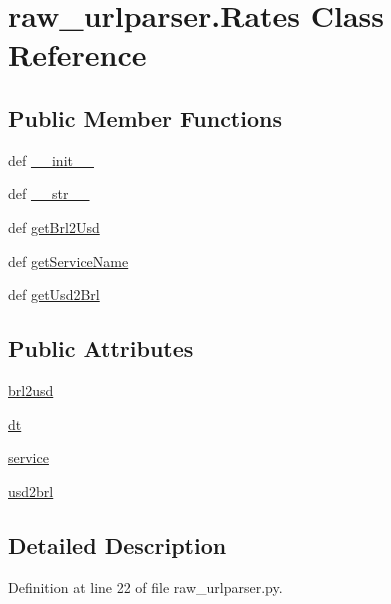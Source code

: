 \hypertarget{classraw__urlparser_1_1_rates}{\section{raw\-\_\-urlparser.\-Rates Class Reference}
\label{classraw__urlparser_1_1_rates}
}
\subsection*{Public Member Functions}
\begin{DoxyCompactItemize}
\item 
def \hyperlink{classraw__urlparser_1_1_rates_a2de6334a686a8a81c619d99de46e43df}{\-\_\-\-\_\-init\-\_\-\-\_\-}
\item 
def \hyperlink{classraw__urlparser_1_1_rates_a166ead3ebf1546ec2ea3eb299d524a30}{\-\_\-\-\_\-str\-\_\-\-\_\-}
\item 
def \hyperlink{classraw__urlparser_1_1_rates_a435ff5562321da275bb95823a346bc5c}{get\-Brl2\-Usd}
\item 
def \hyperlink{classraw__urlparser_1_1_rates_a4579624e853a4d83c5b7df9c390de5b5}{get\-Service\-Name}
\item 
def \hyperlink{classraw__urlparser_1_1_rates_aaf3f32369f17da5fc903a7a51feca25f}{get\-Usd2\-Brl}
\end{DoxyCompactItemize}
\subsection*{Public Attributes}
\begin{DoxyCompactItemize}
\item 
\hyperlink{classraw__urlparser_1_1_rates_adc9df007bec75344f9f89cb631d1aeb3}{brl2usd}
\item 
\hyperlink{classraw__urlparser_1_1_rates_a09b3c7cb595f3135c3eda648b1bb4c3f}{dt}
\item 
\hyperlink{classraw__urlparser_1_1_rates_acb05316e95a39bc42590a882712f854b}{service}
\item 
\hyperlink{classraw__urlparser_1_1_rates_a52d9b688be8385a87783b27839749b4a}{usd2brl}
\end{DoxyCompactItemize}


\subsection{Detailed Description}


Definition at line 22 of file raw\-\_\-urlparser.\-py.



